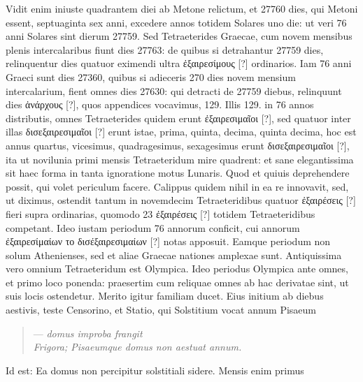 Vidit enim iniuste quadrantem diei ab Metone relictum, et
27760 dies, qui Metoni essent, septuaginta sex anni, excedere annos
totidem Solares uno die: ut veri 76 anni Solares sint dierum 27759.
Sed  Tetraeterides Graecae, cum novem mensibus
 plenis intercalaribus
fiunt dies 27763: de quibus si detrahantur 27759 dies, relinquentur
dies quatuor eximendi ultra  \textgreek{ἐξαιρεσίμους [?]}
 ordinarios.
Iam
76 anni Graeci sunt dies 27360, quibus si adieceris 270 dies novem
mensium intercalarium, fient omnes dies 27630: qui detracti de
27759 diebus, relinquunt dies \textgreek{ἀνάρχους [?]},
 quos appendices vocavimus,
129.
Illis 129. in 76 annos distributis, omnes 
 Tetraeterides quidem
erunt \textgreek{ἐξαιρεσιμαῖοι [?]}, sed quatuor inter illas
 \textgreek{δισεξαιρεσιμαῖοι [?]} erunt istae,
prima, quinta, decima, quinta decima, hoc est annus quartus, vicesimus,
quadragesimus, sexagesimus erunt \textgreek{δισεξαιρεσιμαῖοι [?]},
 ita ut novilunia primi
mensis Tetraeteridum mire quadrent: et sane elegantissima sit haec
forma in tanta ignoratione motus Lunaris.
Quod et quiuis deprehendere
possit, qui volet periculum facere.
Calippus quidem nihil in
ea re innovavit, sed, ut diximus, ostendit tantum in novemdecim Tetraeteridibus
quatuor \textgreek{ἐξαιρέσεις [?]} fieri supra  ordinarias,
 quomodo 23
\textgreek{ἐξαιρέσεις [?]} totidem Tetraeteridibus competant.
Ideo iustam periodum
76 annorum conficit, cui annorum
 \textgreek{ἐξαιρεσίμαίων το δισέξαιρεσιμαίων [?]} notas
apposuit.
Eamque periodum non solum Athenienses, sed et aliae
Graecae nationes amplexae sunt.
Antiquissima vero omnium Tetraeteridum
est Olympica.
Ideo periodus Olympica ante omnes, et primo
loco ponenda: praesertim cum reliquae omnes ab hac derivatae sint, ut
suis locis ostendetur.
Merito igitur familiam ducet.
Eius initium ab diebus
aestivis, teste Censorino, et Statio, qui Solstitium vocat annum
Pisaeum
\begin{verse}
--- \emph{domus improba frangit}\\
\emph{Frigora; Pisaeumque domus non aestuat annum.}
\end{verse}
Id est: Ea domus non percipitur solstitiali sidere.
Mensis enim primus
